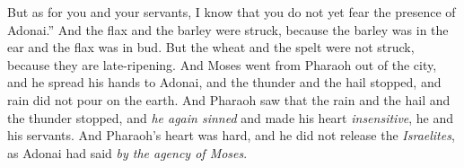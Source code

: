 \begin{biblechapter}
\verse But as for you and your servants, I know that you do not yet fear the presence of Adonai.”
\verse And the flax and the barley were struck, because the barley was in the ear and the flax was in bud.
\verse But the wheat and the spelt were not struck, because they are late-ripening.
\verse And Moses went from Pharaoh out of the city, and he spread his hands to Adonai, and the thunder and the hail stopped, and rain did not pour on the earth.
\verse And Pharaoh saw that the rain and the hail and the thunder stopped, and \textit{he again sinned} and made his heart \textit{insensitive}, he and his servants.
\verse And Pharaoh’s heart was hard, and he did not release the \textit{Israelites}, as Adonai had said \textit{by the agency of Moses}.
\end{biblechapter}

